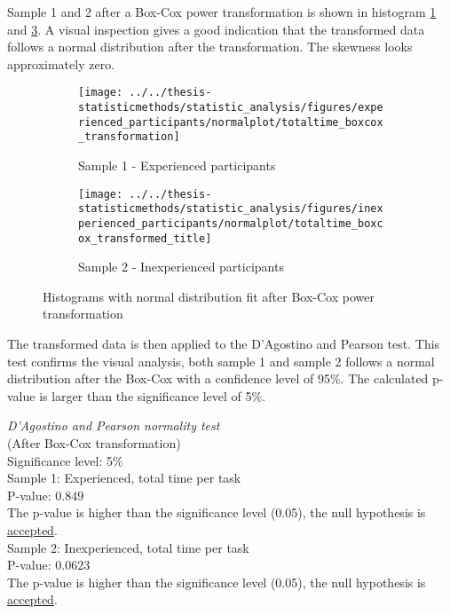 Sample 1 and 2 after a Box-Cox power transformation is shown in histogram \ref{fig:totaltimeboxcoxtransformation_experienced} and \ref{fig:totaltimeboxcoxtransformedtitle_inexperienced}. A visual inspection gives a good indication that the transformed data follows a normal distribution after the transformation. The skewness looks approximately zero.

\begin{figure}[H]
	\centering
	\begin{subfigure}[b]{0.48\textwidth}
		\centering
		\texttt{[image: ../../thesis-statisticmethods/statistic\_analysis/figures/experienced\_participants/normalplot/totaltime\_boxcox\_transformation]}
		\caption[Experienced, Box-Cox]{Sample 1 - Experienced participants}
		\label{fig:totaltimeboxcoxtransformation_experienced}
	\end{subfigure}
	\begin{subfigure}[b]{0.48\textwidth}
		\centering
		\texttt{[image: ../../thesis-statisticmethods/statistic\_analysis/figures/inexperienced\_participants/normalplot/totaltime\_boxcox\_transformed\_title]}
		\caption[Inexperienced, Box-Cox]{Sample 2 - Inexperienced participants}
		\label{fig:totaltimeboxcoxtransformedtitle_inexperienced}
	\end{subfigure}
\caption{Histograms with normal distribution fit after Box-Cox power transformation}
\end{figure}

The transformed data is then applied to the D'Agostino and Pearson test. This test confirms the visual analysis, both sample 1 and sample 2 follows a normal distribution after the Box-Cox with a confidence level of 95\%. The calculated p-value is larger than the significance level of 5\%. \\[0.3cm] 

\begin{center}
	\begin{tcolorbox}[width=0.8\textwidth]
		\centering
		\textit{D'Agostino and Pearson normality test}\\
		(After Box-Cox transformation) \\
		Significance level: 5\%  \\[0.5cm]
		
		Sample 1: Experienced, total time per task\\
		P-value: $0.849$\\
		The p-value is higher than the significance level (0.05), the null hypothesis is \underline{accepted}. \\[0.5cm]
		
		Sample 2: Inexperienced, total time per task \\ %
		P-value: $0.0623$ \\
		The p-value is higher than the significance level (0.05), the null hypothesis is \underline{accepted}. \\[0.5cm]
	\end{tcolorbox}
\end{center}

